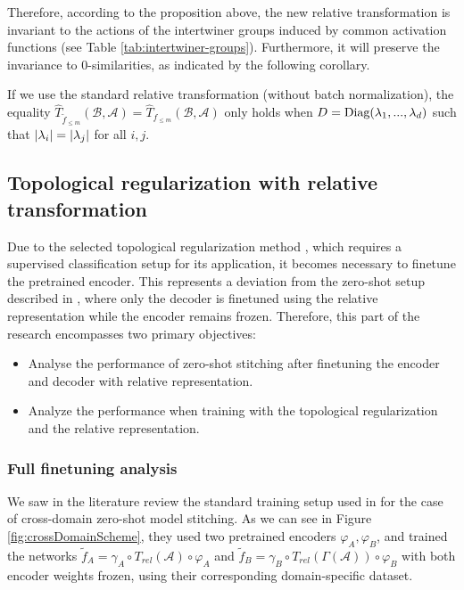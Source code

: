 \documentclass[../main.tex]{subfiles}
\begin{document}
Therefore, according to the proposition above, the new relative transformation is invariant to the actions of the intertwiner groups induced by common activation functions (see Table \ref{tab:intertwiner-groups}). Furthermore, it will preserve the invariance to $0$-similarities, as indicated by the following corollary.

\begin{corollary}
If we use the standard relative transformation (without batch normalization), the equality $\hat{T}_{\tilde{f}_{\leq m}}(\mathcal{B}, \mathcal{A}) = \hat{T}_{f_{\leq m}}(\mathcal{B}, \mathcal{A})$ only holds when $D=\text{\rm Diag}(\lambda_1,..., \lambda_d)$ such that $\left\lvert \lambda_i \right\rvert=\left\lvert \lambda_j \right\rvert$ for all $i, j$.
\end{corollary}

\subsection{Topological regularization with relative transformation}
\label{sec:topo_meth}

Due to the selected topological regularization method \cite{hofer_densified_2021}, which requires a supervised classification setup for its application, it becomes necessary to finetune the pretrained encoder. This represents a deviation from the zero-shot setup described in \cite{moschella_relative_2022}, where only the decoder is finetuned using the relative representation while the encoder remains frozen. Therefore, this part of the research encompasses two primary objectives:

\begin{itemize}
    \item Analyse the performance of zero-shot stitching after finetuning the encoder and decoder with relative representation.
    
    \item Analyze the performance when training with the topological regularization and the relative representation. 
\end{itemize}

\subsubsection*{Full finetuning analysis}

We saw in the literature review the standard training setup used in \cite{moschella_relative_2022} for the case of cross-domain zero-shot model stitching. As we can see in Figure \ref{fig:crossDomainScheme}, they used two pretrained encoders $\varphi_A, \varphi_B$, and trained the networks $\tilde{f}_{A}=\gamma_A \circ T_{rel}(\mathcal{A})  \circ \varphi_A$ and $\tilde{f}_{B}=\gamma_B \circ T_{rel}(\Gamma(\mathcal{A}))  \circ \varphi_B$ with both encoder weights frozen, using their corresponding domain-specific dataset.
\end{document}
